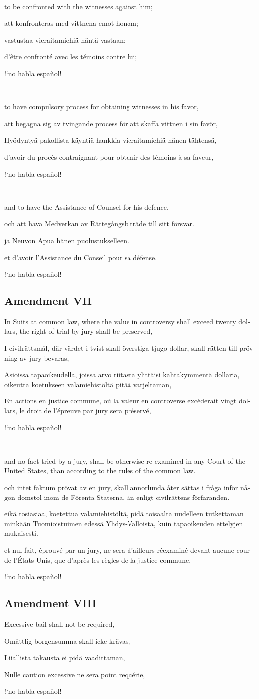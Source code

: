 \documentclass[a4paper,landscape,10pt]{article}
\newcommand{\tblock}[5]{\noindent\begin{minipage}[t]{0.18\textwidth}\foreignlanguage{english}{#1}\end{minipage}\hskip 0.025\textwidth\begin{minipage}[t]{0.18\textwidth}\foreignlanguage{swedish}{#2}\end{minipage}\hskip 0.025\textwidth\begin{minipage}[t]{0.18\textwidth}\foreignlanguage{finnish}{#3}\end{minipage}\hskip 0.025\textwidth\begin{minipage}[t]{0.18\textwidth}\foreignlanguage{french}{#4}\end{minipage}\hskip 0.025\textwidth\begin{minipage}[t]{0.18\textwidth}\foreignlanguage{spanish}{#5}\end{minipage}}
\begin{document}
~

\tblock
{to be confronted with the witnesses against him;}
{att konfronteras med vittnena emot honom;}	
{vastustaa vieraitamiehiä häntä vastaan;}
{d'être confronté avec les témoins contre lui;}
{!`no habla español!}

~

\tblock
{to have compulsory process for obtaining witnesses in his favor,}
{att begagna sig av tvingande process för att skaffa vittnen i sin favör,}
{Hyödyntyä pakollista käyntiä hankkia vieraitamiehiä hänen tähtensä,}
{d'avoir du procès contraignant pour obtenir des témoins à sa faveur,}
{!`no habla español!}

~

\tblock
{and to have the Assistance of Counsel for his defence.}
{och att hava Medverkan av Rättegångsbiträde till sitt försvar.}
{ja Neuvon Apua hänen puolustukselleen.}
{et d'avoir l'Assistance du Conseil pour sa défense.}
{!`no habla español!}


\subsection*{Amendment VII}
\tblock
{In Suits at common law, where the value in controversy shall exceed twenty dollars, the right of trial by jury shall be preserved,}
{I civilrättsmål, där värdet i tvist skall överstiga tjugo dollar, skall rätten till prövning av jury bevaras,}
{Asioissa tapaoikeudella, joissa arvo riitasta ylittäisi kahtakymmentä dollaria, oikeutta koetukseen valamiehistöltä pitää varjeltaman,}
{En actions en justice commune, où la valeur en controverse excéderait vingt dollars, le droit de l'épreuve par jury sera préservé,}
{!`no habla español!}

~

\tblock
{and no fact tried by a jury, shall be otherwise re-examined in any Court of the United States, than according to the rules of the common law.}
{och intet faktum prövat av en jury, skall annorlunda åter sättas i fråga inför någon domstol inom de Förenta Staterna, än enligt civilrättens förfaranden.}
{eikä tosiasiaa, koetettua valamiehistöltä, pidä toisaalta uudelleen tutkettaman minkään Tuomioistuimen edessä Yhdys-Valloista, kuin tapaoikeuden ettelyjen mukaisesti.}
{et nul fait, éprouvé par un jury, ne sera d'ailleurs réexaminé devant aucune cour de l'États-Unis, que d'après les règles de la justice commune.}
{!`no habla español!}


\subsection*{Amendment VIII}
\tblock
{Excessive bail shall not be required,}
{Omåttlig borgensumma skall icke krävas,}
{Liiallista takausta ei pidä vaadittaman,}
{Nulle caution excessive ne sera point requérie,}
{!`no habla español!}
\end{document}
